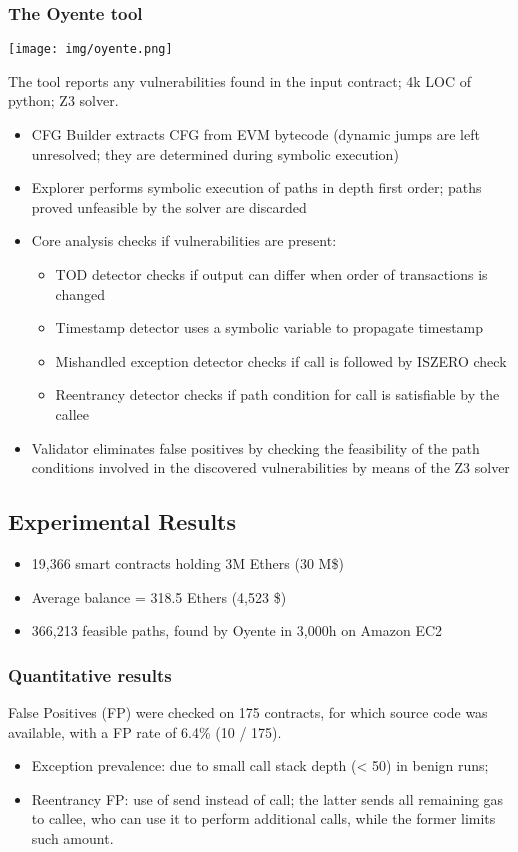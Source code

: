 \documentclass[a4paper, 10pt, titlepage]{article}
\begin{document}
\subsubsection{The Oyente tool}
\begin{center}
\texttt{[image: img/oyente.png]}
\end{center}
The tool reports any vulnerabilities found in the input contract; 4k LOC of python; Z3 solver.
\begin{itemize}
\item CFG Builder extracts CFG from EVM bytecode (dynamic jumps are left unresolved; they are determined during symbolic execution)
\item Explorer performs symbolic execution of paths in depth first order; paths proved unfeasible by the solver are discarded
\item Core analysis checks if vulnerabilities are present:
\begin{itemize}
\item TOD detector checks if output can differ when order of transactions is changed
\item Timestamp detector uses a symbolic variable to propagate timestamp
\item Mishandled exception detector checks if call is followed by ISZERO check
\item Reentrancy detector checks if path condition for call is satisfiable by the callee
\end{itemize}
\item Validator eliminates false positives by checking the feasibility of the path conditions
involved in the discovered vulnerabilities by means of the Z3 solver
\end{itemize}

\subsection{Experimental Results}
\begin{itemize}
\item 19,366 smart contracts holding 3M Ethers (30 M\$)
\item Average balance = 318.5 Ethers (4,523 \$)
\item 366,213 feasible paths, found by Oyente in 3,000h on Amazon EC2
\end{itemize}

\subsubsection*{Quantitative results}
False Positives (FP) were checked on 175 contracts, for which source code was available, with a FP rate of 6.4\% (10 / 175).
\begin{itemize}
\item Exception prevalence: due to small call stack depth (< 50) in benign runs;
\item Reentrancy FP: use of send instead of call; the latter sends all remaining gas to callee, who can use it to perform additional calls, while the former limits such amount.
\end{itemize}
\end{document}

